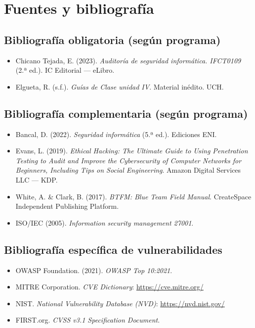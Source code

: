 \documentclass[11pt,a4paper]{article}
\begin{document}
\section{Fuentes y bibliografía}

\subsection{Bibliografía obligatoria (según programa)}
\begin{itemize}[leftmargin=*]
  \item Chicano Tejada, E. (2023). \textit{Auditoría de seguridad informática. IFCT0109} (2.ª ed.). IC Editorial --- eLibro.
  \item Elgueta, R. (s.f.). \textit{Guías de Clase unidad IV}. Material inédito. UCH.
\end{itemize}

\subsection{Bibliografía complementaria (según programa)}
\begin{itemize}[leftmargin=*]
  \item Bancal, D. (2022). \textit{Seguridad informática} (5.ª ed.). Ediciones ENI.
  \item Evans, L. (2019). \textit{Ethical Hacking: The Ultimate Guide to Using Penetration Testing to Audit and Improve the Cybersecurity of Computer Networks for Beginners, Including Tips on Social Engineering}. Amazon Digital Services LLC --- KDP.
  \item White, A. \& Clark, B. (2017). \textit{BTFM: Blue Team Field Manual}. CreateSpace Independent Publishing Platform.
  \item ISO/IEC (2005). \textit{Information security management 27001}.
\end{itemize}

\subsection{Bibliografía específica de vulnerabilidades}
\begin{itemize}[leftmargin=*]
  \item OWASP Foundation. (2021). \textit{OWASP Top 10:2021}.
  \item MITRE Corporation. \textit{CVE Dictionary}: \url{https://cve.mitre.org/}
  \item NIST. \textit{National Vulnerability Database (NVD)}: \url{https://nvd.nist.gov/}
  \item FIRST.org. \textit{CVSS v3.1 Specification Document}.
\end{itemize}
\end{document}
